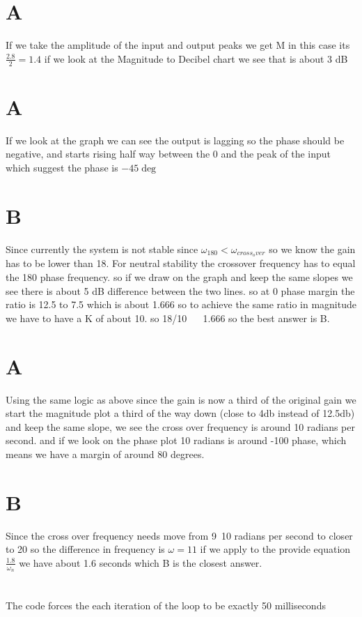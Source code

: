 \documentclass[11pt,english]{article}
\begin{document}
\section{A}   
If we take the amplitude of the input and output peaks we get M 
in this case its $ \frac{2.8}{2 } = 1.4 $ if we look at the Magnitude to Decibel chart we see that is about 3 dB 
\section{A}  
If we look at the graph we can see the output is lagging so the phase should be negative, and starts rising half way between the 0 and the peak of the input which suggest the phase is $-45\deg$ 
\section{B}
Since currently the system is not stable since $\omega_{180} < \omega_{cross_over} $  so we know the gain has to be lower than 18. For neutral stability the crossover frequency  has to equal the 180 phase frequency. so if we draw on the graph and keep the same slopes we see there is about 5 dB difference between the two lines. so at 0 phase margin the ratio is 12.5 to 7.5 which is about 1.666 so to achieve the same ratio in magnitude we have to have a K of about 10. so  18/10 ~~ 1.666 so the best answer is B. 

\section{A}
Using the same logic as above since the gain is now a third of the original gain we start the magnitude plot a third of the way down (close to 4db instead of 12.5db) and keep the same slope, we see the cross over frequency is around 10 radians per second. and if we look on the phase plot 10 radians is around -100 phase, which means we have a margin of around 80 degrees. 

\section{B}
Since the  cross over frequency needs move from 9~10 radians per second to closer to 20 so the difference in frequency is $\omega = 11$ if we apply to the provide equation $\frac{1.8}{\omega_n} $ we have about 1.6 seconds which B is the closest answer. 
\section{}
The code forces the each iteration of the loop to be exactly 50 milliseconds 
\end{document}
